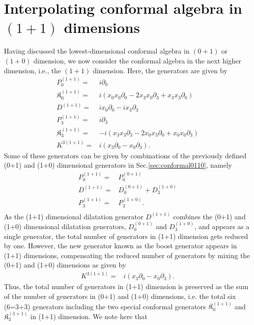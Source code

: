 \documentclass[%
 reprint,
superscriptaddress,
 amsmath,amssymb,
 aps,
]{revtex4-2}
\begin{document}
\section{Interpolating conformal algebra in \texorpdfstring{$(1+1)$}{Lg} dimensions}
\label{sec:conformal}
Having discussed the lowest-dimensional conformal algebra in $(0+1)$ or $(1+0)$ dimension, we now consider the conformal algebra in the next higher dimension, i.e., the $(1+1)$ dimension. Here, the generators are given by
\begin{align}
    P^{(1+1)}_{0}=&i\partial_{0}\\
    \mathfrak{K}^{(1+1)}_{{0}}=&i(x_{0}x_{0}\partial_{{0}}-2x_{3}x_{0}\partial_{3}+x_{3}x_{3}\partial_{0})\\
    D^{(1+1)}=&ix_{0}\partial_{0}-ix_{3}\partial_{3}\\
    P^{(1+1)}_{3}=&i\partial_{3}\\
    \mathfrak{K}^{(1+1)}_{{3}}=&-i(x_{3}x_{3}\partial_{{3}}-2x_{0}x_{3}\partial_{0}+x_{0}x_{0}\partial_{3})\\
    K^{3(1+1)}=&i(x_{3}\partial_{0}-x_{0}\partial_{3}).
\end{align}
Some of these generators can be given by 
combinations of the previously defined (0+1) and (1+0) dimensional generators in Sec.\ref{sec:conformal0110}, namely
\begin{align}
    P^{(1+1)}_{0}=&P^{(0+1)}_{0}\\
    D^{(1+1)}=&D^{(0+1)}_{0}+D^{(1+0)}_{3}\\
    P^{(1+1)}_{3}=&P^{(1+0)}_{3}.\\
\end{align}
As the (1+1) dimensional dilatation generator $D^{(1+1)}$ combines the (0+1) and (1+0) dimensional dilatation generators, $D^{(0+1)}_{0}$ and $D^{(1+0)}_{3}$, and appears as a single generator, the total number of generators in (1+1) dimension gets reduced by one. 
However, the new generator known as the boost generator appears in (1+1) dimensions, compensating the reduced number of generators by mixing the (0+1) and (1+0) dimensions as given by
\begin{align}
K^{3(1+1)}=&i(x_{3}\partial_{0}-x_{0}\partial_{3}).
\end{align}
Thus, the total number of generators in (1+1) dimension is preserved as the sum of the number of generators in (0+1) and (1+0) dimensions, i.e. the total six (6=3+3) generators including the two special conformal generators $\mathfrak{K}^{(1+1)}_{{0}}$ and $\mathfrak{K}^{(1+1)}_{{3}}$ in (1+1) dimension. We note here that 
\end{document}

